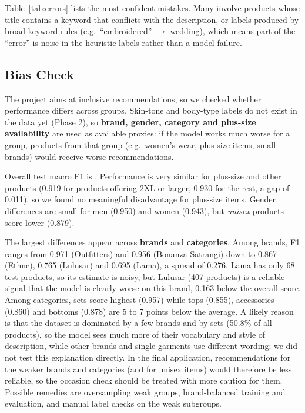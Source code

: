 Table~\ref{tab:errors} lists the most confident mistakes. Many involve products whose title contains a keyword that conflicts with the description, or labels produced by broad keyword rules (e.g.\ ``embroidered'' $\to$ wedding), which means part of the ``error'' is noise in the heuristic labels rather than a model failure.
\begin{table}[htbp]
\centering
\small
{}
\caption{Most confident errors on the test set.}
\label{tab:errors}
\end{table}

\subsection{Bias Check}
The project aims at inclusive recommendations, so we checked whether performance differs across groups. Skin-tone and body-type labels do not exist in the data yet (Phase 2), so \textbf{brand, gender, category and plus-size availability} are used as available proxies: if the model works much worse for a group, products from that group (e.g.\ women's wear, plus-size items, small brands) would receive worse recommendations.

\begin{table}[htbp]
\centering
\small
{}
\caption{Subgroup macro F1 and gap to the overall test F1.}
\end{table}

Overall test macro F1 is \testFone. Performance is very similar for plus-size and other products (0.919 for products offering 2XL or larger, 0.930 for the rest, a gap of 0.011), so we found no meaningful disadvantage for plus-size items. Gender differences are small for men (0.950) and women (0.943), but \emph{unisex} products score lower (0.879).

The largest differences appear across \textbf{brands} and \textbf{categories}. Among brands, F1 ranges from 0.971 (Outfitters) and 0.956 (Bonanza Satrangi) down to 0.867 (Ethnc), 0.765 (Lulusar) and 0.695 (Lama), a spread of 0.276. Lama has only 68 test products, so its estimate is noisy, but Lulusar (407 products) is a reliable signal that the model is clearly worse on this brand, 0.163 below the overall score. Among categories, sets score highest (0.957) while tops (0.855), accessories (0.860) and bottoms (0.878) are 5 to 7 points below the average. A likely reason is that the dataset is dominated by a few brands and by sets (50.8\% of all products), so the model sees much more of their vocabulary and style of description, while other brands and single garments use different wording; we did not test this explanation directly. In the final application, recommendations for the weaker brands and categories (and for unisex items) would therefore be less reliable, so the occasion check should be treated with more caution for them. Possible remedies are oversampling weak groups, brand-balanced training and evaluation, and manual label checks on the weak subgroups.

